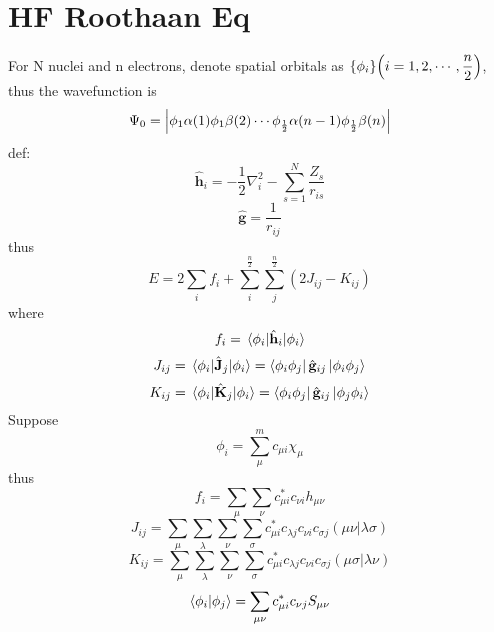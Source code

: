 \documentclass[UTF8]{ctexart} %
\numberwithin{equation}{section}
\begin{document}
\section{HF Roothaan Eq}
For N nuclei and n electrons, denote spatial orbitals as $\{\phi_i\}\qty(i=1,2,\cdots,\dfrac{n}{2})$, thus the wavefunction is
\begin{equation}\label{key}
\Psi_0 = \abs{\phi_1\alpha(1)\phi_1\beta(2)\cdots\phi_{\frac{1}{2}}\alpha(n-1)\phi_{\frac{1}{2}}\beta(n)}
\end{equation}
def:
\begin{equation}\label{key}
\mathbf{\hat{h}}_i = -\dfrac{1}{2}\nabla_i^2 - \sum_{s=1}^N \dfrac{Z_s}{r_{is}}
\end{equation}
\begin{equation}\label{key}
\mathbf{\hat{g}}=\dfrac{1}{r_{ij}}
\end{equation}
thus
\begin{equation}\label{key}
E=2\sum_i f_i + \sum_i^\frac{n}{2}\sum_j^\frac{n}{2}(2J_{ij}-K_{ij})
\end{equation}
where
\begin{equation}\label{key}
f_i=\ev{\hat{\vb{h}}_i}{\phi_i}
\end{equation}
\begin{equation}\label{key}
J_{ij}=\ev{\hat{\vb{J}}_{j}}{\phi_i}=\bra{\phi_i \phi_j}\hat{\vb{g}}_{ij}\ket{\phi_i \phi_j}
\end{equation}
\begin{equation}\label{key}
K_{ij}=\ev{\hat{\vb{K}}_{j}}{\phi_i}=\bra{\phi_i \phi_j}\hat{\vb{g}}_{ij}\ket{\phi_j \phi_i}
\end{equation}
Suppose
\begin{equation}\label{key}
\phi_i=\sum_\mu^m c_{\mu i}\chi_\mu
\end{equation}
thus
\begin{equation}\label{key}
f_i=\sum_\mu\sum_\nu c_{\mu i}^* c_{\nu i}h_{\mu\nu}
\end{equation}
\begin{equation}\label{key}
J_{ij}=\sum_\mu\sum_\lambda\sum_\nu\sum_\sigma c_{\mu i}^*c_{\lambda j} c_{\nu i}c_{\sigma j}(\mu\nu|\lambda\sigma)
\end{equation}
\begin{equation}\label{key}
K_{ij}=\sum_\mu\sum_\lambda\sum_\nu\sum_\sigma c_{\mu i}^*c_{\lambda j} c_{\nu i}c_{\sigma j}(\mu\sigma|\lambda\nu)
\end{equation}
\begin{equation}\label{key}
\braket{\phi_i}{\phi_j}=\sum_{\mu\nu}c_{\mu i}^* c_{\nu j}S_{\mu\nu}
\end{equation}
\end{document}
